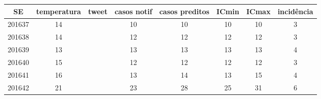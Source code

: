 \begin{tabular}{c|ccccccc}
  \hline
SE & temperatura & tweet & casos notif & casos preditos & ICmin & ICmax & incidência \\ 
  \hline
201637 & 14 &  & 10 & 10 & 10 & 10 & 3 \\ 
  201638 & 14 &  & 12 & 12 & 12 & 12 & 3 \\ 
  201639 & 13 &  & 13 & 13 & 13 & 13 & 4 \\ 
  201640 & 15 &  & 12 & 12 & 12 & 12 & 3 \\ 
  201641 & 16 &  & 13 & 14 & 13 & 15 & 4 \\ 
  201642 & 21 &  & 23 & 28 & 25 & 31 & 6 \\ 
   \hline
\end{tabular}
